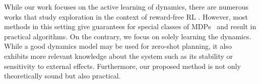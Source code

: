 While our work focuses on the active learning of dynamics, there are numerous works that study exploration in the context of reward-free RL \citep{jin2020reward, kaufmann2021adaptive, wagenmaker2022reward, chen2022statistical}. However, most methods in this setting give guarantees for special classes of MDPs~\citep{jin2020reward, kaufmann2021adaptive, wagenmaker2022reward, qiu2021reward, chen2022statistical} and result in practical algorithms. On the contrary, we focus on solely learning the dynamics. While a good dynamics model may be used for zero-shot planning, it also exhibits more relevant knowledge about the system such as its stability or sensitivity to external effects. Furthermore, our proposed method is not only theoretically sound but also practical. 
